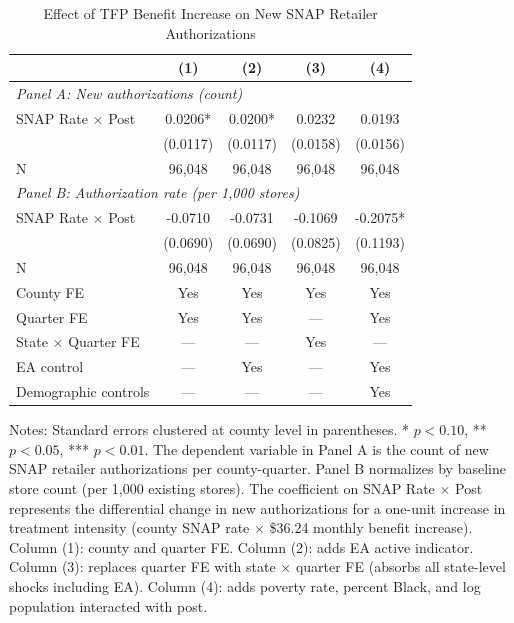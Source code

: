 \begin{table}[H]
\centering
\caption{Effect of TFP Benefit Increase on New SNAP Retailer Authorizations}
\label{tab:main}
\begin{threeparttable}
\begin{tabular}{lcccc}
\toprule
 & (1) & (2) & (3) & (4) \\
\midrule
\multicolumn{5}{l}{\textit{Panel A: New authorizations (count)}} \\[3pt]
SNAP Rate $\times$ Post & 0.0206* & 0.0200* & 0.0232 & 0.0193 \\
 & (0.0117) & (0.0117) & (0.0158) & (0.0156) \\
N & 96,048 & 96,048 & 96,048 & 96,048 \\
\midrule
\multicolumn{5}{l}{\textit{Panel B: Authorization rate (per 1,000 stores)}} \\[3pt]
SNAP Rate $\times$ Post & -0.0710 & -0.0731 & -0.1069 & -0.2075* \\
 & (0.0690) & (0.0690) & (0.0825) & (0.1193) \\
N & 96,048 & 96,048 & 96,048 & 96,048 \\
\midrule
County FE & Yes & Yes & Yes & Yes \\
Quarter FE & Yes & Yes & --- & Yes \\
State $\times$ Quarter FE & --- & --- & Yes & --- \\
EA control & --- & Yes & --- & Yes \\
Demographic controls & --- & --- & --- & Yes \\
\bottomrule
\end{tabular}
\begin{tablenotes}[flushleft]
\small
\item Notes: Standard errors clustered at county level in parentheses. * $p<0.10$, ** $p<0.05$, *** $p<0.01$. The dependent variable in Panel A is the count of new SNAP retailer authorizations per county-quarter. Panel B normalizes by baseline store count (per 1,000 existing stores). The coefficient on SNAP Rate $\times$ Post represents the differential change in new authorizations for a one-unit increase in treatment intensity (county SNAP rate $\times$ \$36.24 monthly benefit increase). Column (1): county and quarter FE. Column (2): adds EA active indicator. Column (3): replaces quarter FE with state $\times$ quarter FE (absorbs all state-level shocks including EA). Column (4): adds poverty rate, percent Black, and log population interacted with post.
\end{tablenotes}
\end{threeparttable}
\end{table}
